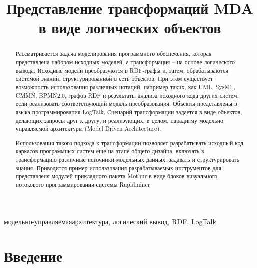 \documentclass[conference]{IEEEtran} \IEEEoverridecommandlockouts
\begin{document}
 \title{Представление трансформаций MDA в виде логических объектов}


\maketitle

\begin{abstract} Рассматривается задача моделирования программного обеспечения, которая представлена набором исходных моделей, а трансформация -- на основе логического вывода. Исходные модели преобразуются в RDF-графы и, затем, обрабатываются системой знаний, структурированной в сеть объектов. При этом существует возможность использования различных нотаций, например таких, как UML, SysML, CMMN, BPMN2.0, графов RDF и результаты анализа исходного кода других систем, если реализовать соответствующий модкль преобразования. Объекты представлены в языка программирования LogTalk. Сценарий трансформации задается в виде объектов, делающих запросы друг к другу, и реализующих, в целом, парадигму модельно--управляемой архитектуры (Model Driven Architecture).

Использования такого подхода к трансформации позволяет разрабатывать исходный код каркасов программных систем еще на этапе общего дизайна, включать в трансформацию различные источники модельных данных, задавать и структурировать знания.  Приводится пример использования разрабатываемых инструментов для представленя модулей прикладного пакета Mothur в виде блоков визуального потокового программирования системы Rapidminer \end{abstract}

\begin{IEEEkeywords} модельно-управляемаяархитектура, логический вывод, 	RDF, LogTalk \end{IEEEkeywords}

\section{Введение} \label{sec:intro}
\end{document}
